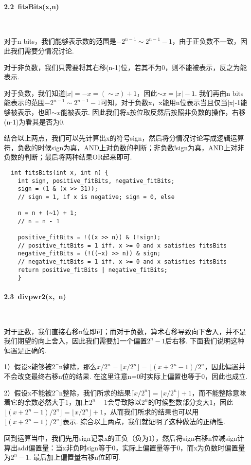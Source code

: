\documentclass[UTF8]{ctexart}
\begin{document}
\paragraph*{2.2\ fitsBits(x,n)}\ \par
对于n bits，我们能够表示数的范围是$-2^{n-1}\sim 2^{n-1}-1$，由于正负数不一致，因此我们需要分情况讨论.\par
对于非负数，我们只需要将其右移(n-1)位，若其不为0，则不能被表示，反之为能表示.\par
对于负数，我们知道$|x|=-x=(\sim x) + 1$，因此$\sim x = |x| - 1$. 我们再由n bits能表示的范围$-2^{n-1}\sim 2^{n-1}-1$可知，对于负数x，x能用n位表示当且仅当|x|-1能够被表示，也即$\sim x$能被表示. 因此我们将x按位取反然后按照非负数的操作，右移(n-1)为看其是否为0.\par
结合以上两点，我们可以先计算出x的符号sign，然后将分情况讨论写成逻辑运算符，负数的时候sign为真，AND上对负数的判断；非负数!sign为真，AND上对非负数的判断；最后将两种结果OR起来即可.
\begin{lstlisting}
  int fitsBits(int x, int n) {
    int sign, positive_fitBits, negative_fitBits;
    sign = (1 & (x >> 31));
    // sign = 1, if x is negative; sign = 0, else

    n = n + (~1) + 1;
    // n = n - 1

    positive_fitBits = !((x >> n)) & (!sign);
    // positive_fitBits = 1 iff. x >= 0 and x satisfies fitsBits 
    negative_fitBits = (!((~x) >> n)) & sign;
    // negative_fitBits = 1 iff. x >= 0 and x satisfies fitsBits 
    return positive_fitBits | negative_fitBits;
    }
\end{lstlisting}

\paragraph*{2.3\ divpwr2(x,\ n)}\ \par
对于正数，我们直接右移n位即可；而对于负数，算术右移导致向下舍入，并不是我们期望的向上舍入，因此我们需要加一个偏置$2^n-1$后右移. 下面我们说明这种偏置是正确的.\par
1）假设x能够被2\^{}n整除，那么$x/2^n=\lfloor x/2^n \rfloor=\lfloor (x+2^n-1)/2^n$，因此偏置并不会改变最终右移n位的结果. 在这里注意n=0时实际上偏置也等于0，因此也成立.\par 2）假设x不能被2\^{}n整除，我们所求的结果$\lceil x/2^n \rceil= \lfloor x/2^n \rfloor +1$，而不能整除意味着它的余数必然大于1，加上$2^n-1$会导致除以$2^n$的时候整数部分变大1，因此$\lfloor (x+2^n-1)/2^n \rfloor = \lfloor x/2^n \rfloor +1$，从而我们所求的结果也可以用$\lfloor (x+2^n-1)/2^n \rfloor$表示. 综合以上两点，我们就证明了这种做法的正确性.\par
回到运算当中，我们先用sign记录x的正负（负为1），然后将sign右移n位减sign计算出add偏置量：当x非负时sign等于0，实际上偏置量等于0，而x为负数时偏置量为$2^n-1$. 最后加上偏置量右移n位即可.
\end{document}
